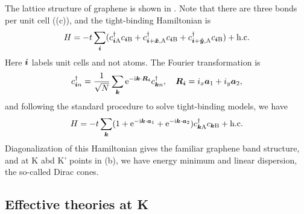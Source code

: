 \documentclass[hyperref, a4paper]{article}
\newcommand*{\ii}{\mathrm{i}}
\newcommand*{\ee}{\mathrm{e}}
\begin{document}
The lattice structure of graphene is shown in .
Note that there are three bonds per unit cell ((c)),
and the tight-binding Hamiltonian is 
\begin{equation}
    H = - t \sum_{\vb*{i}}(
        c^\dagger_{\vb*{i} \text{A}} c_{\vb*{i} \text{B}}
        + c^\dagger_{\vb*{i} + \vu*{x}, \text{A}} c_{\vb*{i} \text{B}}
        + c^\dagger_{\vb*{i} + \vu*{y}, \text{A}} c_{\vb*{i} \text{B}}
    ) + \text{h.c.}
\end{equation}
Here $\vb*{i}$ labels unit cells and not atoms.
The Fourier transformation is 
\begin{equation}
    c^\dagger_{\vb*{i} n} = \frac{1}{\sqrt{N}} \sum_{\vb*{k}} \ee^{- \ii \vb*{k} \cdot \vb*{R}_{\vb*{i}}} c^\dagger_{\vb*{k} n}, \quad 
    \vb*{R}_{\vb*{i}} = i_x \vb*{a}_1 + i_y \vb*{a}_2,
\end{equation}
and following the standard procedure to solve tight-binding models, we have 
\begin{equation}
    H = - t \sum_{\vb*{k}} 
    (1 + \ee^{- \ii \vb*{k} \cdot \vb*{a}_1} + \ee^{- \ii \vb*{k} \cdot \vb*{a}_2}) 
    c^\dagger_{\vb*{k} \text{A}} c_{\vb*{k} \text{B}} + \text{h.c.}
    \label{eq:full-tb-ham}
\end{equation}
Diagonalization of this Hamiltonian gives the familiar graphene band structure,
and at K abd K' points in (b),
we have energy minimum and linear dispersion,
the so-called Dirac cones.

\subsection{Effective theories at K}
\end{document}
